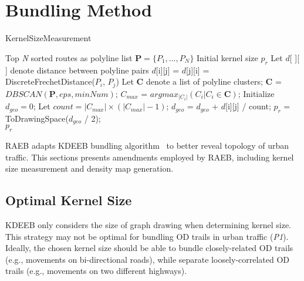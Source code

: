 \section{Bundling Method}
\label{sec:bundling}
\begin{algorithm}[h]
	\caption{KernelSizeMeasurement}\label{al:kernel_size_measurement}
	\begin{algorithmic}[1]
		\Require Top \textit{N} sorted routes as polyline list $\textbf{P} = \{P_1, ..., P_N\}$
		\Ensure Initial kernel size $p_r$		
		\State Let $d$[ ][ ] denote distance between polyline pairs
		\State $d$[i][j] = $d$[j][i] = DiscreteFrechetDistance($P_i$, $P_j$)
		\EndFor
		\EndFor
		\State Let \textbf{C} denote a list of polyline clusters;
		\State \textbf{C} = $DBSCAN(\textbf{P}, eps, minNum)$;
		\State $C_{max}$ = $argmax_{|C_i|}(C_i | C_i \in \textbf{C})$;
		\State Initialize $d_{geo} = 0$;
		\State Let $count = |C_{max}| \times (|C_{max}| - 1)$;
		\State $d_{geo}$ = $d_{geo}$ + $d$[i][j] / count;
		\EndFor
		\EndFor
		\State $p_r$ = ToDrawingSpace($d_{geo}$ / 2); \\
		\Return $p_r$
	\end{algorithmic}
\end{algorithm}


RAEB adapts KDEEB bundling algorithm~\cite{hurter2012graph} to better reveal topology of urban traffic.
This sections presents amendments employed by RAEB, including kernel size measurement and density map generation.



\subsection{Optimal Kernel Size}
\label{ssec:kernel_size}
KDEEB only considers the size of graph drawing when determining kernel size.
This strategy may not be optimal for bundling OD trails in urban traffic (\textit{P1}).
Ideally, the chosen kernel size should be able to bundle closely-related OD trails (e.g., movements on bi-directional roads), while separate loosely-correlated OD trails (e.g., movements on two different highways).


